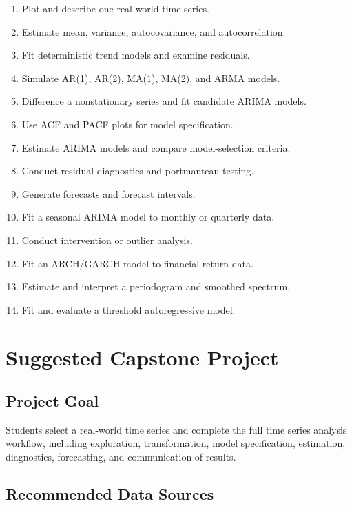 \documentclass[11pt]{article}
\begin{document}
\begin{enumerate}
    \item Plot and describe one real-world time series.
    \item Estimate mean, variance, autocovariance, and autocorrelation.
    \item Fit deterministic trend models and examine residuals.
    \item Simulate AR(1), AR(2), MA(1), MA(2), and ARMA models.
    \item Difference a nonstationary series and fit candidate ARIMA models.
    \item Use ACF and PACF plots for model specification.
    \item Estimate ARIMA models and compare model-selection criteria.
    \item Conduct residual diagnostics and portmanteau testing.
    \item Generate forecasts and forecast intervals.
    \item Fit a seasonal ARIMA model to monthly or quarterly data.
    \item Conduct intervention or outlier analysis.
    \item Fit an ARCH/GARCH model to financial return data.
    \item Estimate and interpret a periodogram and smoothed spectrum.
    \item Fit and evaluate a threshold autoregressive model.
\end{enumerate}

\section{Suggested Capstone Project}

\subsection{Project Goal}

Students select a real-world time series and complete the full time series analysis workflow, including exploration, transformation, model specification, estimation, diagnostics, forecasting, and communication of results.

\subsection{Recommended Data Sources}
\end{document}
